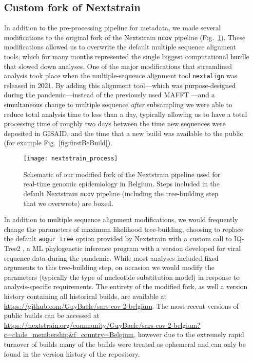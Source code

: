 \subsection{Custom fork of Nextstrain}
In addition to the pre-processing pipeline for metadata, we made several modifications to the original fork of the Nextstrain \verb|ncov| pipeline (Fig.~\ref{fig:beNxt}).
These modifications allowed us to overwrite the default multiple sequence alignment tools, which for many months represented the single biggest computational hurdle that slowed down analyses.
One of the major modifications that streamlined analysis took place when the multiple-sequence alignment tool \verb|nextalign| \citep{aksamentov2021nextclade} was released in 2021.
By adding this alignment tool---which was purpose-designed during the pandemic---instead of the previously used MAFFT \citep{katoh2013mafft}---and a simultaneous change to multiple sequence \textit{after} subsampling we were able to reduce total analysis time to less than a day, typically allowing us to have a total processing time of roughly two days between the time new sequences were deposited in GISAID, and the time that a new build was available to the public (for example Fig.~\ref{fig:firstBeBuild}).

\begin{figure}[ht]
  \centering
  \texttt{[image: nextstrain\_process]}
  \caption[Modified Nextstrain pipeline]{Schematic of our modified fork of the Nextstrain pipeline used for real-time genomic epidemiology in Belgium. Steps included in the default Nextstrain \verb|ncov| pipeline (including the tree-building step that we overwrote) are boxed.}
  \label{fig:beNxt}
\end{figure}

In addition to multiple sequence alignment modifications, we would frequently change the parameters of maximum likelihood tree-building, choosing to replace the default \verb|augur tree| option provided by Nextstrain with a custom call to IQ-Tree2 \citep{minh2020iq}, a ML phylogenetic inference program with a version developed for viral sequence data during the pandemic.
While most analyses included fixed arguments to this tree-building step, on occasion we would modify the parameters (typically the type of nucleotide substitution model) in response to analysis-specific requirements.
The entirety of the modified fork, as well a version history containing all historical builds, are available at \url{https://github.com/GuyBaele/sars-cov-2-belgium}.
The most-recent versions of public builds can be accessed at \url{https://nextstrain.org/community/GuyBaele/sars-cov-2-belgium?c=clade_membership&f_country=Belgium}, however due to the extremely rapid turnover of builds many of the builds were treated as ephemeral and can only be found in the version history of the repository.


